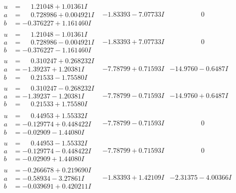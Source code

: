 \documentclass[1p]{elsarticle_modified}
\theoremstyle{definition}
\begin{document}
$$\begin{array}{c|c|c}
\begin{aligned}
u &= \phantom{-}1.21048 + 1.01361 I \\
a &= \phantom{-}0.728986 + 0.004921 I \\
b &= -0.376227 + 1.161460 I\end{aligned}
 & -1.83393 - 7.07733 I & \phantom{-0.000000 } 0 \\ \hline\begin{aligned}
u &= \phantom{-}1.21048 - 1.01361 I \\
a &= \phantom{-}0.728986 - 0.004921 I \\
b &= -0.376227 - 1.161460 I\end{aligned}
 & -1.83393 + 7.07733 I & \phantom{-0.000000 } 0 \\ \hline\begin{aligned}
u &= \phantom{-}0.310247 + 0.268232 I \\
a &= -1.39237 + 1.20381 I \\
b &= \phantom{-}0.21533 - 1.75580 I\end{aligned}
 & -7.78799 + 0.71593 I & -14.9760 - 0.6487 I \\ \hline\begin{aligned}
u &= \phantom{-}0.310247 - 0.268232 I \\
a &= -1.39237 - 1.20381 I \\
b &= \phantom{-}0.21533 + 1.75580 I\end{aligned}
 & -7.78799 - 0.71593 I & -14.9760 + 0.6487 I \\ \hline\begin{aligned}
u &= \phantom{-}0.44953 + 1.55332 I \\
a &= -0.129774 + 0.448422 I \\
b &= -0.02909 - 1.44080 I\end{aligned}
 & -7.78799 - 0.71593 I & \phantom{-0.000000 } 0 \\ \hline\begin{aligned}
u &= \phantom{-}0.44953 - 1.55332 I \\
a &= -0.129774 - 0.448422 I \\
b &= -0.02909 + 1.44080 I\end{aligned}
 & -7.78799 + 0.71593 I & \phantom{-0.000000 } 0 \\ \hline\begin{aligned}
u &= -0.266678 + 0.219690 I \\
a &= -0.58934 - 3.27861 I \\
b &= -0.039691 + 0.420211 I\end{aligned}
 & -1.83393 + 1.42109 I & -2.31375 - 4.00366 I \\ \hline\begin{aligned}

\end{aligned}
\end{array}$$
\end{document}

